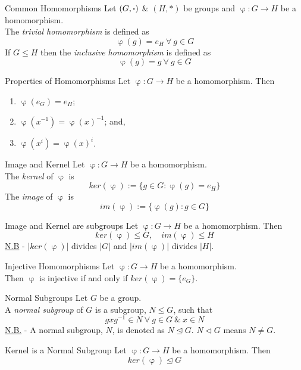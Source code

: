 \documentclass[11pt,a4paper]{article}
\begin{document}
\subtitle{Remark 15.02 - }{Common Homomorphisms}
Let $(G, \boldsymbol{\cdot})$ \& $(H, *)$ be groups and $\upvarphi : G \to H$ be a homomorphism.\\
The \textit{trivial homomorphism} is defined as
$$\upvarphi(g) = e_H\ \forall\ g \in G$$
If $G \leq H$ then the \textit{inclusive homomorphism} is defined as
$$\upvarphi(g) = g\ \forall\ g \in G$$

\subtitle{Proposition 15.03 - }{Properties of Homomorphisms}
Let $\upvarphi : G \to H$ be a homomorphism. Then
\begin{enumerate}[label=\roman*)]
  \item $\upvarphi(e_G) = e_H$;
  \item $\upvarphi(x^{-1}) = \upvarphi(x)^{-1}$; and,
  \item $\upvarphi(x^i) = \upvarphi(x)^i$.
\end{enumerate}

\subtitle{Definition 15.04 - }{Image and Kernel}
Let $\upvarphi : G \to H$ be a homomorphism.\\
The \textit{kernel} of $\upvarphi$ is
$$ker(\upvarphi) := \{g \in G : \upvarphi(g) = e_H\}$$
The \textit{image} of $\upvarphi$ is
$$im(\upvarphi) := \{\upvarphi(g) : g \in G\}$$

\subtitle{Theorem 15.05 - }{Image and Kernel are subgroups}
Let $\upvarphi : G \to H$ be a homomorphism. Then
$$ker(\upvarphi) \leq G,\quad im(\upvarphi) \leq H$$
\underline{N.B} - $|ker(\upvarphi)|$ divides $|G|$ and $|im(\upvarphi)|$ divides $|H|$.\\

\subtitle{Proposition 15.06 - }{Injective Homomorphisms}
Let $\upvarphi : G \to H$ be a homomorphism.\\
Then $\upvarphi$ is injective if and only if $ker(\upvarphi) = \{e_G\}$.\\

\subtitle{Definition 15.07 - }{Normal Subgroups}
Let $G$ be a group.\\
A \textit{normal subgroup} of $G$ is a subgroup, $N \leq G$, such that
$$gxg^{-1} \in N\ \forall\ g \in G\ \&\ x \in N$$
\underline{N.B.} - A normal subgroup, $N$, is denoted as $N \trianglelefteq G$. $N \triangleleft G$ means $N \neq G$.\\

\subtitle{Proposition 15.08 - }{Kernel is a Normal Subgroup}
Let $\upvarphi : G \to H$ be a homomorphism. Then\\
$$ker(\upvarphi) \trianglelefteq G$$
\end{document}
